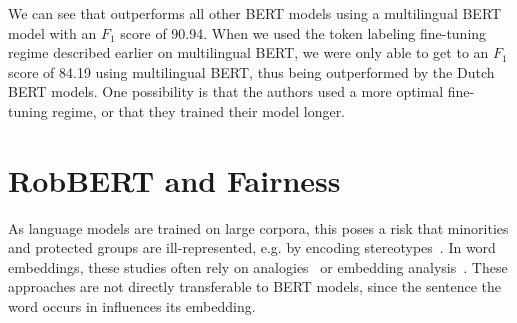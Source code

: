 \documentclass[11pt,a4paper]{article}
\begin{document}
\begin{table}[htb]
\centering
\caption{NER for various models, $F_1$ score calculated with the CoNLL 2002 evaluation script, except for $\dagger$ which used the Seqeval Python library, * from \citet{wuBeto2019}, ** from \citet{brandsen2019bert}, *** from \citet{devriesBERTje2019}.}
\label{tab:results-tokens-ner} 

\end{table}

We can see that \citep{wuBeto2019} outperforms all other BERT models using a multilingual BERT model with an $F_1$ score of 90.94.
When we used the token labeling fine-tuning regime described earlier on multilingual BERT, we were only able to get to an $F_1$ score of 84.19 using multilingual BERT, thus being outperformed by the Dutch BERT models.
One possibility is that the authors used a more optimal fine-tuning regime, or that they trained their model longer.



\section{RobBERT and Fairness}

As language models are trained on large corpora, this poses a risk that minorities and protected groups are ill-represented, e.g. by encoding stereotypes~\citep{bolukbasi2016man, zhaoGender2019, gonen-goldberg-2019-lipstick}.
In word embeddings, these studies often rely on analogies~\citep{bolukbasi2016man,caliskanSemantics2017}
or embedding analysis~\cite{gonen-goldberg-2019-lipstick}.
These approaches are not directly transferable to BERT models, 
since the sentence the word occurs in influences its embedding.
\end{document}
